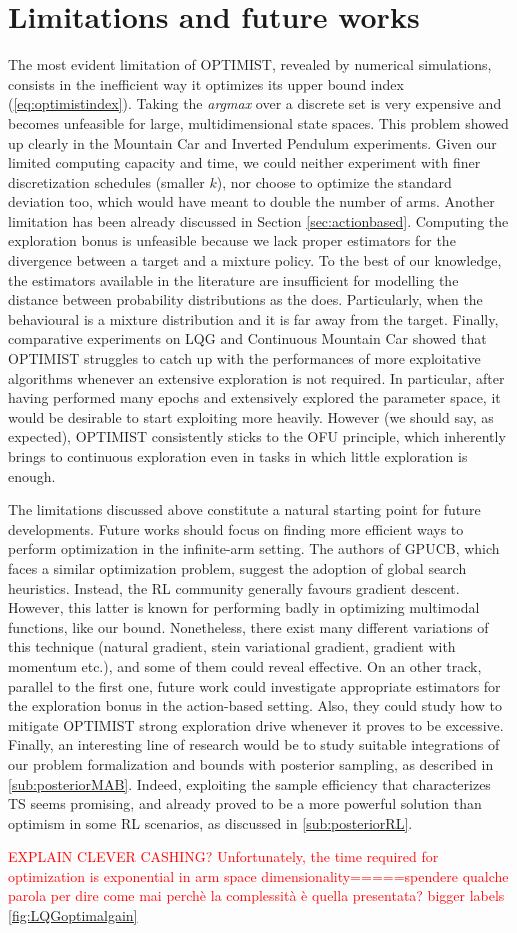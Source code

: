 \section{Limitations and future works}
The most evident limitation of \gls{OPTIMIST}, revealed by numerical simulations, consists in the inefficient way it optimizes its upper bound index (\ref{eq:optimistindex}). Taking the \emph{argmax} over a discrete set is very expensive and becomes unfeasible for large, multidimensional state spaces. This problem showed up clearly in the Mountain Car and Inverted Pendulum experiments. Given our limited computing capacity and time, we could neither experiment with finer discretization schedules (smaller $k$), nor choose to optimize the standard deviation too, which would have meant to double the number of arms.
Another limitation has been already discussed in Section \ref{sec:actionbased}. Computing the exploration bonus is unfeasible because we lack proper estimators for the \Renyi divergence between a target and a mixture policy. To the best of our knowledge, the estimators available in the literature are insufficient for modelling the distance between probability distributions as the \Renyi does. Particularly, when the behavioural is a mixture distribution and it is far away from the target.
Finally, comparative experiments on \gls{LQG} and  Continuous Mountain Car showed that \gls{OPTIMIST} struggles to catch up with the performances of more exploitative algorithms whenever an extensive exploration is not required. In particular, after having performed many epochs and extensively explored the parameter space, it would be desirable to start exploiting more heavily. However (we should say, as expected), \gls{OPTIMIST} consistently sticks to the \gls{OFU} principle, which inherently brings to continuous exploration even in tasks in which little exploration is enough.

The limitations discussed above constitute a natural starting point for future developments.
Future works should focus on finding more efficient ways to perform optimization in
the infinite-arm setting. The authors of \gls{GPUCB}, which faces a similar optimization problem, suggest the adoption of global search heuristics. Instead, the \gls{RL} community generally favours gradient descent. However, this latter is known for performing badly in optimizing multimodal functions, like our bound. Nonetheless, there exist many different variations of this technique (natural gradient, stein variational gradient, gradient with momentum etc.), and some of them could reveal effective.
On an other track, parallel to the first one, future work could investigate appropriate estimators for the exploration bonus in the action-based setting. Also, they could study how to mitigate \gls{OPTIMIST} strong exploration drive whenever it proves to be excessive.
Finally, an interesting line of research would be to study suitable integrations of our problem formalization and bounds with posterior sampling, as described in \ref{sub:posteriorMAB}. Indeed, exploiting the sample efficiency that characterizes \gls{TS} seems promising, and already proved to be a more powerful solution than optimism in some \gls{RL} scenarios, as discussed in \ref{sub:posteriorRL}. 


\textcolor{red}{EXPLAIN CLEVER CASHING?}
\textcolor{red}{Unfortunately, the time required for optimization is exponential in arm space dimensionality=====spendere qualche parola per dire come mai perchè la complessità è quella presentata?}
\textcolor{red}{bigger labels \ref{fig:LQGoptimalgain}}